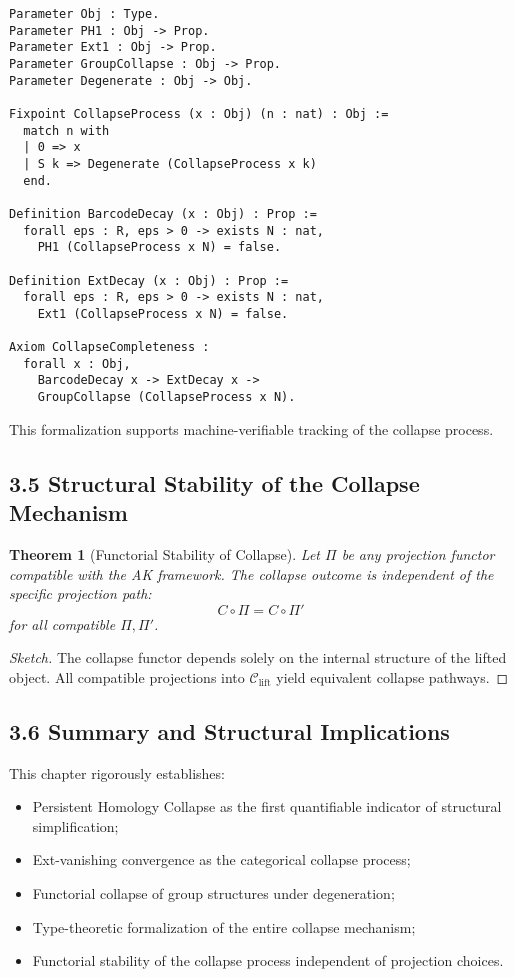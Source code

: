 \documentclass[11pt]{article}
\newtheorem{theorem}{Theorem}[section]
\begin{document}
\begin{lstlisting}[language=Coq, caption=Collapse Process Encoding]
Parameter Obj : Type.
Parameter PH1 : Obj -> Prop.
Parameter Ext1 : Obj -> Prop.
Parameter GroupCollapse : Obj -> Prop.
Parameter Degenerate : Obj -> Obj.

Fixpoint CollapseProcess (x : Obj) (n : nat) : Obj :=
  match n with
  | 0 => x
  | S k => Degenerate (CollapseProcess x k)
  end.

Definition BarcodeDecay (x : Obj) : Prop :=
  forall eps : R, eps > 0 -> exists N : nat,
    PH1 (CollapseProcess x N) = false.

Definition ExtDecay (x : Obj) : Prop :=
  forall eps : R, eps > 0 -> exists N : nat,
    Ext1 (CollapseProcess x N) = false.

Axiom CollapseCompleteness :
  forall x : Obj,
    BarcodeDecay x -> ExtDecay x ->
    GroupCollapse (CollapseProcess x N).
\end{lstlisting}

This formalization supports machine-verifiable tracking of the collapse process.

\subsection{3.5 Structural Stability of the Collapse Mechanism}

\begin{theorem}[Functorial Stability of Collapse]
Let $\Pi$ be any projection functor compatible with the AK framework. The collapse outcome is independent of the specific projection path:
\begin{equation}
C \circ \Pi = C \circ \Pi'
\end{equation}
for all compatible $\Pi, \Pi'$.
\end{theorem}

\begin{proof}[Sketch]
The collapse functor depends solely on the internal structure of the lifted object. All compatible projections into $\mathcal{C}_{\mathrm{lift}}$ yield equivalent collapse pathways.
\end{proof}

\subsection{3.6 Summary and Structural Implications}

This chapter rigorously establishes:

\begin{itemize}
    \item Persistent Homology Collapse as the first quantifiable indicator of structural simplification;
    \item Ext-vanishing convergence as the categorical collapse process;
    \item Functorial collapse of group structures under degeneration;
    \item Type-theoretic formalization of the entire collapse mechanism;
    \item Functorial stability of the collapse process independent of projection choices.
\end{itemize}
\end{document}
